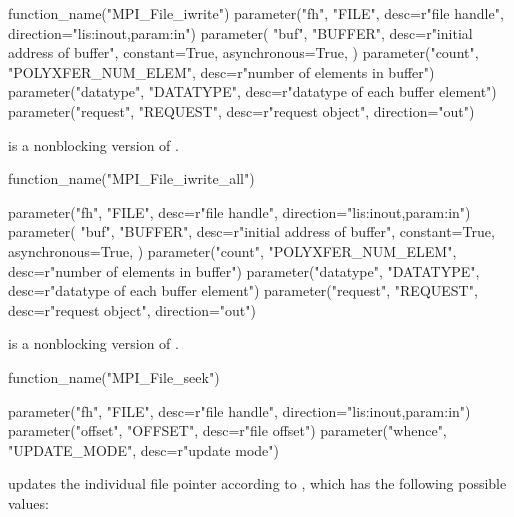 %
%
\begin{mpi-binding}
    function_name("MPI_File_iwrite")
    parameter("fh", "FILE", desc=r"file handle", direction="lis:inout,param:in")
    parameter(
        "buf",
        "BUFFER",
        desc=r"initial address of buffer",
        constant=True,
        asynchronous=True,
    )
    parameter("count", "POLYXFER_NUM_ELEM", desc=r"number of elements in buffer")
    parameter("datatype", "DATATYPE", desc=r"datatype of each buffer element")
    parameter("request", "REQUEST", desc=r"request object", direction="out")
\end{mpi-binding}

 is a nonblocking version of .

%
%
\begin{mpi-binding}
    function_name("MPI_File_iwrite_all")
    
    parameter("fh", "FILE", desc=r"file handle", direction="lis:inout,param:in")
    parameter(
        "buf",
        "BUFFER",
        desc=r"initial address of buffer",
        constant=True,
        asynchronous=True,
    )
    parameter("count", "POLYXFER_NUM_ELEM", desc=r"number of elements in buffer")
    parameter("datatype", "DATATYPE", desc=r"datatype of each buffer element")
    parameter("request", "REQUEST", desc=r"request object", direction="out")
\end{mpi-binding}

 is a nonblocking version
of .

%
%
\begin{mpi-binding}
    function_name("MPI_File_seek")
    
    parameter("fh", "FILE", desc=r"file handle", direction="lis:inout,param:in")
    parameter("offset", "OFFSET", desc=r"file offset")
    parameter("whence", "UPDATE_MODE", desc=r"update mode")
\end{mpi-binding}

 updates the individual file pointer according to 
,
which has the following possible values:
\begin{constlist}
\end{constlist}
 
